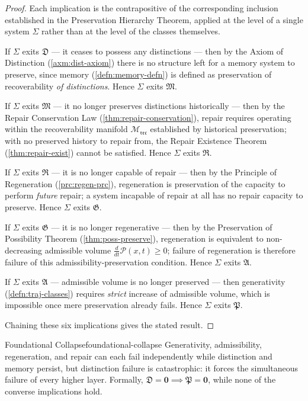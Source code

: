 \documentclass[12pt,twoside,openright]{book}
\newcommand{\reco}{\mathfrak{rec}}
\begin{document}
\begin{proof}
  Each implication is the contrapositive of the
  corresponding inclusion established in the Preservation
  Hierarchy Theorem, applied at the level of a single
  system $\Sigma$ rather than at the level of the classes
  themselves.

  If $\Sigma$ exits $\mathfrak{D}$ --- it ceases to possess
  any distinctions --- then by the Axiom of Distinction
  (\cref{axm:dist-axiom}) there is no structure left for a
  memory system to preserve, since memory
  (\cref{defn:memory-defn}) is defined as preservation of
  recoverability \emph{of distinctions}. Hence $\Sigma$
  exits $\mathfrak{M}$.

  If $\Sigma$ exits $\mathfrak{M}$ --- it no longer
  preserves distinctions historically --- then by the
  Repair Conservation Law (\cref{thm:repair-conservation}),
  repair requires operating within the recoverability
  manifold $\mathcal{M}_\reco$ established by historical
  preservation; with no preserved history to repair from,
  the Repair Existence Theorem (\cref{thm:repair-exist})
  cannot be satisfied. Hence $\Sigma$ exits $\mathfrak{R}$.

  If $\Sigma$ exits $\mathfrak{R}$ --- it is no longer
  capable of repair --- then by the Principle of
  Regeneration (\cref{prc:regen-prc}), regeneration is
  preservation of the capacity to perform \emph{future}
  repair; a system incapable of repair at all has no repair
  capacity to preserve. Hence $\Sigma$ exits $\mathfrak{G}$.

  If $\Sigma$ exits $\mathfrak{G}$ --- it is no longer
  regenerative --- then by the Preservation of Possibility
  Theorem (\cref{thm:poss-preserve}), regeneration is
  equivalent to non-decreasing admissible volume
  $\frac{d}{dt}\mathcal{P}(x,t)\ge0$; failure of regeneration
  is therefore failure of this admissibility-preservation
  condition. Hence $\Sigma$ exits $\mathfrak{A}$.

  If $\Sigma$ exits $\mathfrak{A}$ --- admissible volume is
  no longer preserved --- then generativity
  (\cref{defn:traj-classes}) requires \emph{strict} increase
  of admissible volume, which is impossible once mere
  preservation already fails. Hence $\Sigma$ exits
  $\mathfrak{P}$.

  Chaining these six implications gives the stated
  result.
\end{proof}

\begin{corollary}{Foundational Collapse}{foundational-collapse}
  Generativity, admissibility, regeneration, and repair can
  each fail independently while distinction and memory
  persist, but distinction failure is catastrophic: it
  forces the simultaneous failure of every higher layer.
  Formally, $\mathfrak{D}=\mathbf{0} \implies
  \mathfrak{P}=\mathbf{0}$, while none of the converse
  implications hold.
\end{corollary}
\end{document}
